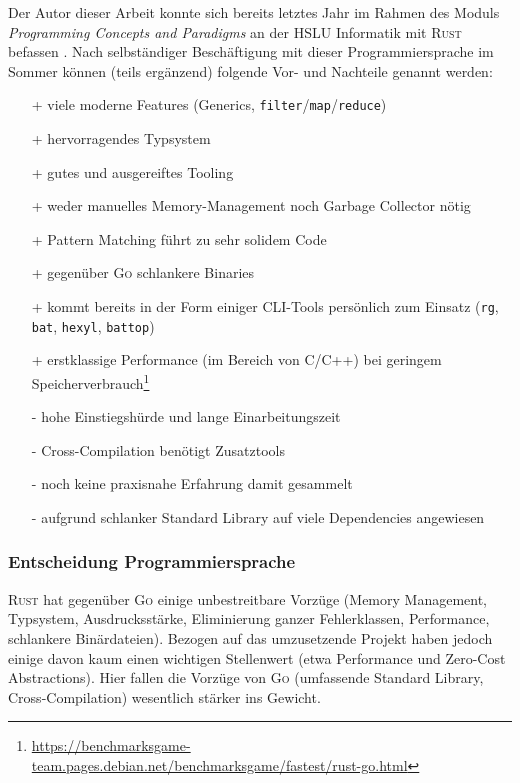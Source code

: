 Der Autor dieser Arbeit konnte sich bereits letztes Jahr im Rahmen des Moduls \textit{Programming Concepts and Paradigms} an der HSLU Informatik mit \textsc{Rust} befassen \cite[S. 12]{pcp-rust}. Nach selbständiger Beschäftigung mit dieser Programmiersprache im Sommer können (teils ergänzend) folgende Vor- und Nachteile genannt werden:

\begin{itemize}
    \item[+] viele moderne Features (Generics, \texttt{filter}/\texttt{map}/\texttt{reduce})
    \item[+] hervorragendes Typsystem
    \item[+] gutes und ausgereiftes Tooling
    \item[+] weder manuelles Memory-Management noch Garbage Collector nötig
    \item[+] Pattern Matching führt zu sehr solidem Code
    \item[+] gegenüber \textsc{Go} schlankere Binaries
    \item[+] kommt bereits in der Form einiger CLI-Tools persönlich zum Einsatz (\texttt{rg}, \texttt{bat}, \texttt{hexyl}, \texttt{battop})
    \item[+] erstklassige Performance (im Bereich von C/C++) bei geringem Speicherverbrauch\footnote{\url{https://benchmarksgame-team.pages.debian.net/benchmarksgame/fastest/rust-go.html}}
    \item[-] hohe Einstiegshürde und lange Einarbeitungszeit
    \item[-] Cross-Compilation benötigt Zusatztools
    \item[-] noch keine praxisnahe Erfahrung damit gesammelt
    \item[-] aufgrund schlanker Standard Library auf viele Dependencies angewiesen
\end{itemize}

\subsubsection{Entscheidung Programmiersprache}
\label{sec:Entscheidung-Programmiersprache}

\textsc{Rust} hat gegenüber \textsc{Go} einige unbestreitbare Vorzüge (Memory Management, Typsystem, Ausdrucksstärke, Eliminierung ganzer Fehlerklassen, Performance, schlankere Binärdateien). Bezogen auf das umzusetzende Projekt haben jedoch einige davon kaum einen wichtigen Stellenwert (etwa Performance und Zero-Cost Abstractions). Hier fallen die Vorzüge von \textsc{Go} (umfassende Standard Library, Cross-Compilation) wesentlich stärker ins Gewicht.

